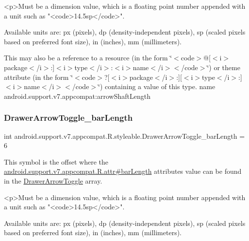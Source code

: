 \begin{DoxyVerb}      <p>Must be a dimension value, which is a floating point number appended with a unit such as "<code>14.5sp</code>".
\end{DoxyVerb}
 Available units are\+: px (pixels), dp (density-\/independent pixels), sp (scaled pixels based on preferred font size), in (inches), mm (millimeters). 

This may also be a reference to a resource (in the form \char`\"{}$<$code$>$@\mbox{[}$<$i$>$package$<$/i$>$\+:\mbox{]}$<$i$>$type$<$/i$>$\+:$<$i$>$name$<$/i$>$$<$/code$>$\char`\"{}) or theme attribute (in the form \char`\"{}$<$code$>$?\mbox{[}$<$i$>$package$<$/i$>$\+:\mbox{]}\mbox{[}$<$i$>$type$<$/i$>$\+:\mbox{]}$<$i$>$name$<$/i$>$$<$/code$>$\char`\"{}) containing a value of this type.  name android.\+support.\+v7.\+appcompat\+:arrow\+Shaft\+Length \mbox{\label{classandroid_1_1support_1_1v7_1_1appcompat_1_1R_1_1styleable_ae8ef18fa510292b2f8b05f36c70631bb}} 
\subsubsection{\texorpdfstring{Drawer\+Arrow\+Toggle\+\_\+bar\+Length}{DrawerArrowToggle\_barLength}}
{\footnotesize\ttfamily int android.\+support.\+v7.\+appcompat.\+R.\+styleable.\+Drawer\+Arrow\+Toggle\+\_\+bar\+Length = 6\hspace{0.3cm}{\ttfamily [static]}}

This symbol is the offset where the \hyperlink{classandroid_1_1support_1_1v7_1_1appcompat_1_1R_1_1attr_a7b7ce7358f8999f6e3d75b7456383a9c}{android.\+support.\+v7.\+appcompat.\+R.\+attr\#bar\+Length} attribute\textquotesingle{}s value can be found in the \hyperlink{classandroid_1_1support_1_1v7_1_1appcompat_1_1R_1_1styleable_a7bd3ecc07eb763b454c40c0871959a35}{Drawer\+Arrow\+Toggle} array.

\begin{DoxyVerb}      <p>Must be a dimension value, which is a floating point number appended with a unit such as "<code>14.5sp</code>".
\end{DoxyVerb}
 Available units are\+: px (pixels), dp (density-\/independent pixels), sp (scaled pixels based on preferred font size), in (inches), mm (millimeters). 

